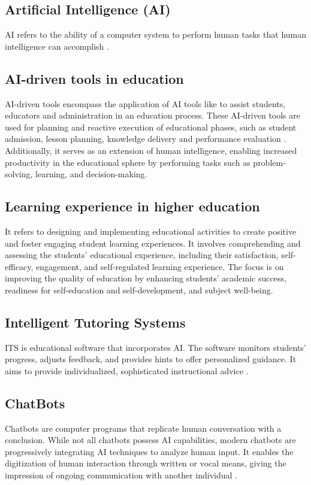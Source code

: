 \subsection{Artificial Intelligence (AI)}
AI refers to the ability of a computer system to perform human tasks that human intelligence can accomplish \citep{sadiku_ai_2021}.
\subsection{AI-driven tools in education}
AI-driven tools encompass the application of AI tools like  to assist students,
educators and administration in an education process. These AI-driven tools are used for
planning and reactive execution of educational phases, such as student admission, lesson planning,
knowledge delivery and performance evaluation \citep{mallik_proactive_2023}.
Additionally, it serves as an extension of human intelligence, enabling increased productivity in
the educational sphere by performing tasks such as problem-solving, learning, and decision-making\citep{cheng_widespread_2023}.
\subsection{Learning experience in higher education}
It refers to designing and implementing educational activities to create positive
and foster engaging student learning experiences\citep{kang_supporting_2023}.
It involves comprehending and assessing the students’ educational experience, including their satisfaction,
self-efficacy, engagement, and self-regulated learning experience\citep{lyz_students_2022}.
The focus is on improving the quality of education by enhancing students’ academic success,
readiness for self-education and self-development, and subject well-being\citep{iordache-platis_building_2018}.
\subsection{Intelligent Tutoring Systems}
ITS is educational software that incorporates AI. The software monitors students’ progress,
adjusts feedback, and provides hints to offer personalized guidance\citep{shute_intelligent_2010}. It aims to provide individualized, sophisticated instructional advice
\citep{sedlmeier_intelligent_2001}.
\subsection{ ChatBots }
Chatbots are computer programs that replicate human conversation with a conclusion.
While not all chatbots possess AI capabilities, modern chatbots are progressively
integrating AI techniques to analyze human input\citep{IBM_withnodate}.
It enables the digitization of human interaction through written or vocal means,
giving the impression of ongoing communication with another individual \citep{oracle_what_nodate}.
